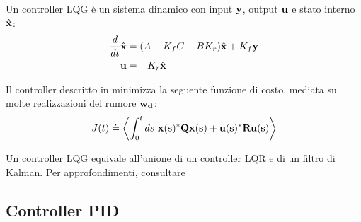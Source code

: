 \begin{framed} %
  Un controller \textsc{LQG} è un sistema dinamico con input $\bf y$, output $\bf u$ e stato interno
  $\hat{\bf x}$:
  \begin{equation}
    \begin{aligned}[c]
      \frac d {dt} \hat {\bf x} &= (A-K_f C - B K_r) \hat{\bf x} + K_f \bf y \\ %
      \bf u               &= -K_r \hat{\bf x}
    \end{aligned}
    \label{eq:lqg}
  \end{equation}
\end{framed}
\begin{framed} %
  Il controller descritto in %
  minimizza la seguente funzione di costo, mediata su molte realizzazioni del rumore $\bf w_d$:
  \begin{equation}
    J(t) \doteq \left<
      \int_0^t  ds\ \bf{x} (s)^* Q \bf {x} (s) + \bf {u} (s)^* R \bf {u} (s) %
    \right>
    \label{eq:lqg-costo}
  \end{equation}
\end{framed}

Un controller \textsc{LQG} equivale all'unione di un controller \textsc{LQR} e di un filtro di Kalman.
Per approfondimenti, consultare %


\subsection{Controller \textsc{PID}}\label{subsec:intro-pid}
